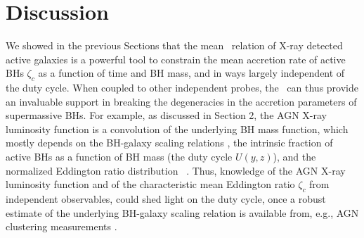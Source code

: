 \section{Discussion}\label{sec:disc}

We showed in the previous Sections that the mean \LXMS\ relation of X-ray detected active
galaxies is a powerful tool to constrain the mean accretion rate of active BHs $\zeta_c$ as
a function of time and BH mass, and in ways largely independent of the duty cycle. When
coupled to other independent probes, the \LXMS\ can thus provide an invaluable support in
breaking the degeneracies in the accretion parameters of supermassive BHs. 
For example, as discussed in Section 2, the AGN X-ray luminosity function is a convolution
of the underlying BH mass function, which mostly depends on the BH-galaxy scaling relations
\citep[e.g.,][]{Salucci99}, the intrinsic fraction of active BHs as a function of BH
mass (the duty cycle $U(y,z)$), and the normalized Eddington ratio distribution \PLz\
\citep[see, e.g.,][and references therein]{Shankar13Acc}. Thus, knowledge of the AGN X-ray
luminosity function and of the characteristic mean Eddington ratio $\zeta_c$ from independent
observables, could shed light on the duty cycle, once a robust estimate of the underlying
BH-galaxy scaling relation is available from, e.g., AGN clustering measurements
\citep[see discussion in][]{ShankarNat,Allevato21,Viita21}. 

